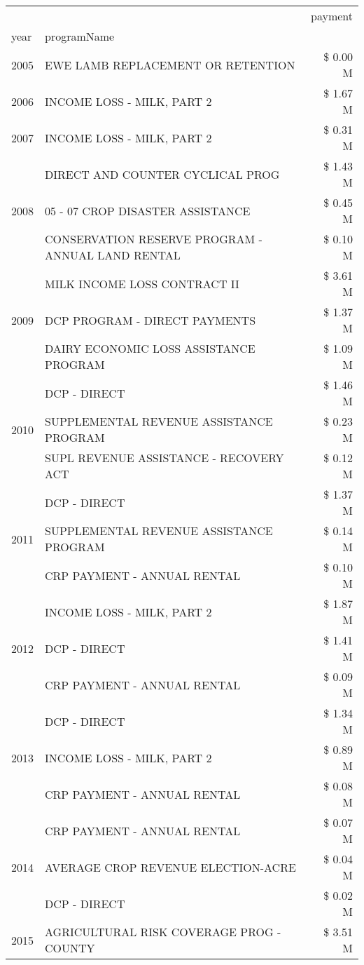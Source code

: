 \begin{tabular}{llr}
\toprule
 &  & payment \\
year & programName &  \\
\midrule
2005 & EWE LAMB REPLACEMENT OR RETENTION & \$ 0.00 M \\
\cline{1-3}
2006 & INCOME LOSS - MILK, PART 2 & \$ 1.67 M \\
\cline{1-3}
2007 & INCOME LOSS - MILK, PART 2 & \$ 0.31 M \\
\cline{1-3}
\multirow[t]{3}{*}{2008} & DIRECT AND COUNTER CYCLICAL PROG & \$ 1.43 M \\
 & 05 - 07 CROP DISASTER ASSISTANCE & \$ 0.45 M \\
 & CONSERVATION RESERVE PROGRAM - ANNUAL LAND RENTAL & \$ 0.10 M \\
\cline{1-3}
\multirow[t]{3}{*}{2009} & MILK INCOME LOSS CONTRACT II & \$ 3.61 M \\
 & DCP PROGRAM - DIRECT PAYMENTS & \$ 1.37 M \\
 & DAIRY ECONOMIC LOSS ASSISTANCE PROGRAM & \$ 1.09 M \\
\cline{1-3}
\multirow[t]{3}{*}{2010} & DCP - DIRECT & \$ 1.46 M \\
 & SUPPLEMENTAL REVENUE ASSISTANCE PROGRAM & \$ 0.23 M \\
 & SUPL REVENUE ASSISTANCE - RECOVERY ACT & \$ 0.12 M \\
\cline{1-3}
\multirow[t]{3}{*}{2011} & DCP - DIRECT & \$ 1.37 M \\
 & SUPPLEMENTAL REVENUE ASSISTANCE PROGRAM & \$ 0.14 M \\
 & CRP PAYMENT - ANNUAL RENTAL & \$ 0.10 M \\
\cline{1-3}
\multirow[t]{3}{*}{2012} & INCOME LOSS - MILK, PART 2 & \$ 1.87 M \\
 & DCP - DIRECT & \$ 1.41 M \\
 & CRP PAYMENT - ANNUAL RENTAL & \$ 0.09 M \\
\cline{1-3}
\multirow[t]{3}{*}{2013} & DCP - DIRECT & \$ 1.34 M \\
 & INCOME LOSS - MILK, PART 2 & \$ 0.89 M \\
 & CRP PAYMENT - ANNUAL RENTAL & \$ 0.08 M \\
\cline{1-3}
\multirow[t]{3}{*}{2014} & CRP PAYMENT - ANNUAL RENTAL & \$ 0.07 M \\
 & AVERAGE CROP REVENUE ELECTION-ACRE & \$ 0.04 M \\
 & DCP - DIRECT & \$ 0.02 M \\
\cline{1-3}
\multirow[t]{3}{*}{2015} & AGRICULTURAL RISK COVERAGE PROG - COUNTY & \$ 3.51 M \\

\end{tabular}
